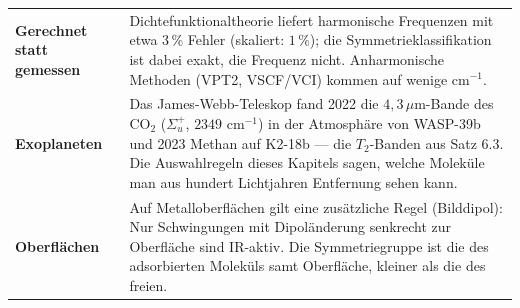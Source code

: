 \begin{forschung}
\begin{center}
{\small
\renewcommand{\arraystretch}{1.45}
\begin{tabular}{@{}P{3.0cm}P{5.2cm}@{}}
\toprule
\textbf{Gerechnet statt gemessen} & Dichtefunktionaltheorie liefert harmonische Frequenzen mit etwa $3\,\%$ Fehler (skaliert: $1\,\%$); die Symmetrieklassifikation ist dabei exakt, die Frequenz nicht. Anharmonische Methoden (VPT2, VSCF/VCI) kommen auf wenige cm$^{-1}$.\\
\textbf{Exoplaneten} & Das James-Webb-Teleskop fand 2022 die $4{,}3\,\mu$m-Bande des $\mathrm{CO_2}$ ($\Sigma_u^{+}$, $2349$ cm$^{-1}$) in der Atmosphäre von WASP-39b und 2023 Methan auf K2-18b --- die $T_2$-Banden aus Satz 6.3. Die Auswahlregeln dieses Kapitels sagen, welche Moleküle man aus hundert Lichtjahren Entfernung sehen kann.\\
\textbf{Oberflächen} & Auf Metalloberflächen gilt eine zusätzliche Regel (Bilddipol): Nur Schwingungen mit Dipoländerung senkrecht zur Oberfläche sind IR-aktiv. Die Symmetriegruppe ist die des adsorbierten Moleküls samt Oberfläche, kleiner als die des freien.\\
\bottomrule
\end{tabular}}
\end{center}

\begin{center}
\begin{minipage}{0.88\textwidth}
\end{minipage}
\end{center}
\end{forschung}

